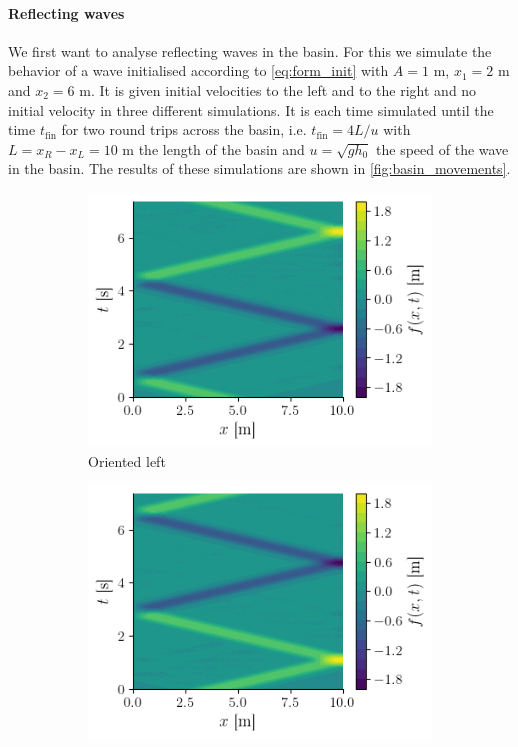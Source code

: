 \paragraph{Reflecting waves} We first want to analyse reflecting waves in the basin. For this we simulate the behavior of a wave initialised according to \autoref{eq:form_init} with $A = 1$ \si{\meter}, $x_1 = 2$ \si{\meter} and $x_2 = 6$ \si{\meter}. It is given initial velocities to the left and to the right and no initial velocity in three different simulations. It is each time simulated until the time $t_\mathrm{fin}$ for two round trips across the basin, i.e. $t_\mathrm{fin} = 4L/u$ with $L = x_R - x_L = 10$ \si{\meter} the length of the basin and $u = \sqrt{gh_0}$ the speed of the wave in the basin. The results of these simulations are shown in \autoref{fig:basin_movements}.
\begin{figure}[h]
    \centering
    \begin{subfigure}{0.48\linewidth}
        \includegraphics[width=\linewidth]{figures/bassin_default_left.png}
        \caption{Oriented left}
        \label{fig:basin_left}
    \end{subfigure}
    \begin{subfigure}{0.48\linewidth}
        \includegraphics[width=\linewidth]{figures/bassin_default_right.png}

\end{subfigure}
\end{figure}
